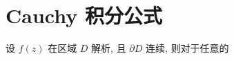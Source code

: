    \section{Cauchy 积分公式}
        \begin{theorem}
            设 $f\left(z\right)$ 在区域 $D$ 解析, 且 $\partial D$ 连续, 则对于任意的 
        \end{theorem}